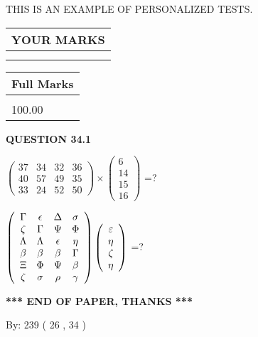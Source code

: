 \documentclass[12pt]{article}
\begin{document}
   
 \vspace{0.2in}
{\Huge  THIS IS AN EXAMPLE OF}
{\Huge  PERSONALIZED TESTS. }
   
   
  
\vspace{0.2in}
  
\noindent\begin{tabular}{|l|}
\hline
 YOUR MARKS  \\
\hline
 \\ 
 \\ 
\hline
\end{tabular}
\hspace{0.05in} \begin{tabular}{|l|}
\hline
 Full Marks  \\
\hline
 \\ 
100.00 \\
\hline
\end{tabular}
{\textbf{\Large{QUESTION
34.1 
}}}
  
  
 
$ \left( \begin{array}{ccccccccc}
 37  & 
 34  & 
 32  & 
 36  \\ 
 40  & 
 57  & 
 49  & 
 35  \\ 
 33  & 
 24  & 
 52  & 
 50
\end{array}\right) \times
\left( \begin{array}{c}
 6  \\ 
 14  \\ 
 15  \\ 
 16
\end{array}\right) $ =?
 
 
$  %
 \left( \begin{array}
 {
 c
 c
 c
 c
 }
 \Gamma & 
 \epsilon & 
 \Delta & 
 \sigma \\ 
                    \zeta & 
 \Gamma & 
 \Psi & 
 \Phi \\ 
 \Lambda & 
 \Lambda & 
 \epsilon & 
 \eta \\ 
 \beta & 
 \beta & 
 \beta & 
 \Gamma \\ 
                    \Xi & 
 \Phi & 
 \Psi & 
 \beta \\ 
                    \zeta & 
 \sigma & 
 \rho & 
 \gamma
 \end{array} \right)
 \left( \begin{array}
 {
 c
 }
 \varepsilon \\ 
 \eta \\ 
                    \zeta \\ 
 \eta
 \end{array} \right)
$ =?
 

 

 
\vspace{0.3in}
   
   
 \vspace{0.2in}
 
   
   
   
   
\vspace{1.0in} 
{\textbf{\large{ *** END OF PAPER, THANKS *** }}} 
   
   
\hspace{1.0in} By: 
 239 ( 26 ,  34 )
   
   
 
 
\end{document}
